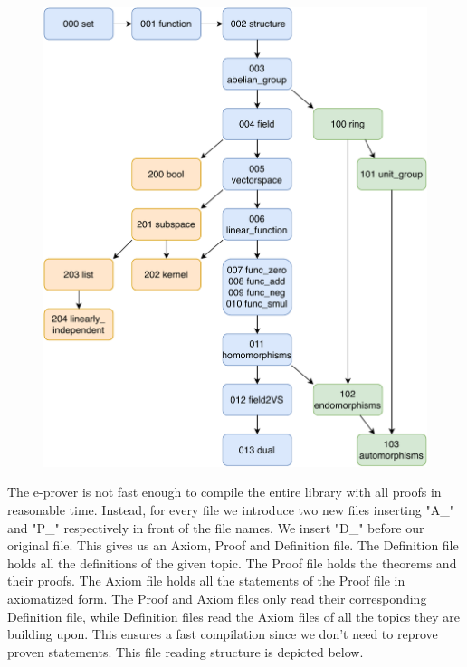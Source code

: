 \documentclass[11pt]{article}
\begin{document}
\begin{figure}[h]
\begin{center}
\includegraphics[scale=0.75]{./project_structure.pdf}
\end{center}
\end{figure}

\newpage

The e-prover is not fast enough to compile the entire library with all proofs in reasonable time. 
Instead, for every file we introduce two new files inserting "A\_" and "P\_" respectively in front of the file names. We insert "D\_" before our original file. This gives us an Axiom, Proof and Definition file. 
The Definition file holds all the definitions of the given topic. 
The Proof file holds the theorems and their proofs. The Axiom file holds all the statements of the Proof file in axiomatized form. 
The Proof and Axiom files only read their corresponding Definition file, while Definition files read the Axiom files of all the topics they are building upon. 
This ensures a fast compilation since we don't need to reprove proven statements. 
This file reading structure is depicted below.
\end{document}
